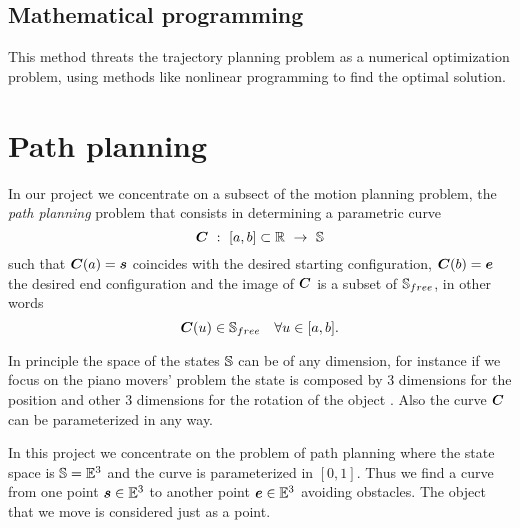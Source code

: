 \documentclass[dissertation.tex]{subfiles}
\begin{document}
\subsection{Mathematical programming}
This method threats the trajectory planning problem as a numerical
optimization problem, using methods like nonlinear programming to
find the optimal solution.

\section{Path planning}
In our project we concentrate on a subsect of the motion planning
problem, the \emph{path planning} problem that consists \cite{choset}
in determining a parametric curve
\begin{equation*}
  \ve{C}\ :\ [a,b]\subset\mR\ \rightarrow\ \mS
\end{equation*}
such that $\boldsymbol{C}(a)=\boldsymbol{s}$ coincides with the desired starting
configuration,
$\boldsymbol{C}(b)=\boldsymbol{e}$ the desired end configuration and the image of
$\boldsymbol{C}$ is a
subset of $\mathbb{S}_{free}$, in other words
\begin{equation*}
\boldsymbol{C}(u)\in\mathbb{S}_{free}\quad \forall u\in[a,b].
\end{equation*}

In principle the space of the states $\mathbb{S}$ can be of any dimension,
for instance if we focus on the piano movers' problem the state is
composed by 3 dimensions for the position and other 3 dimensions for
the rotation of the object \cite{lavalle}. Also
the curve $\boldsymbol{C}$ can be parameterized in any way. 

In this project we
concentrate on the problem of
path planning where the state space is $\mathbb{S}=\mathbb{E}^3$ and the curve is
parameterized in $[0,1]$. Thus we find a curve from one point
$\boldsymbol{s}\in\mathbb{E}^3$ to another point $\boldsymbol{e}\in\mathbb{E}^3$ 
avoiding obstacles. The object that we move is considered just as a
point.
\end{document}
